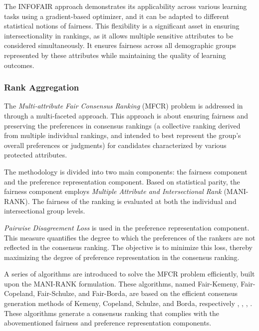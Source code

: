 The INFOFAIR approach demonstrates its applicability across various learning tasks using a gradient-based optimizer, and it can be adapted to different statistical notions of fairness. This flexibility is a significant asset in ensuring intersectionality in rankings, as it allows multiple sensitive attributes to be considered simultaneously. It ensures fairness across all demographic groups represented by these attributes while maintaining the quality of learning outcomes.

\subsubsection{Rank Aggregation}
\label{subsubsec:intrank_meth__other_aggr_22n}


The \emph{Multi-attribute Fair Consensus Ranking} (MFCR) problem is addressed in~\cite{cachel2022mani} through a multi-faceted approach. This approach is about ensuring fairness and preserving the preferences in consensus rankings (a collective ranking derived from multiple individual rankings, and intended to best represent the group's overall preferences or judgments) for candidates characterized by various protected attributes. 

The methodology is divided into two main components: the fairness component and the preference representation component. Based on statistical parity, the fairness component employs \emph{Multiple Attribute and Intersectional Rank} (MANI-RANK). The fairness of the ranking is evaluated at both the individual and intersectional group levels.

\emph{Pairwise Disagreement Loss} is used in the preference representation component. This measure quantifies the degree to which the preferences of the rankers are not reflected in the consensus ranking. The objective is to minimize this loss, thereby maximizing the degree of preference representation in the consensus ranking.

A series of algorithms are introduced to solve the MFCR problem efficiently, built upon the MANI-RANK formulation. These algorithms, named Fair-Kemeny, Fair-Copeland, Fair-Schulze, and Fair-Borda, are based on the efficient consensus generation methods of Kemeny, Copeland, Schulze, and Borda, respectively \cite{kemeny1959mathematics}, \cite{copeland1951reasonable}, \cite{schulze}, \cite{borda1781m}. These algorithms generate a consensus ranking that complies with the abovementioned fairness and preference representation components.

